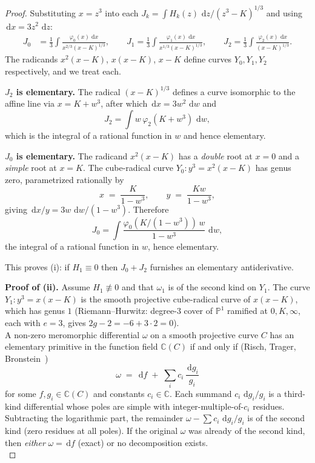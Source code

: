 \documentclass[11pt,a4paper]{article}
\theoremstyle{plain}
\theoremstyle{definition}
\theoremstyle{remark}
\newcommand{\C}{\mathbb{C}}
\renewcommand{\d}{\,\mathrm{d}}
\begin{document}
\begin{proof}
Substituting $x=z^3$ into each $J_k = \int H_k(z)\,\d z/(z^3-K)^{1/3}$ and using $\d x = 3z^2\,\d z$:
\begin{align*}
  J_0 &= \frac{1}{3}\int \frac{\varphi_0(x)\,\d x}{x^{2/3}(x-K)^{1/3}}, \qquad
  J_1 = \frac{1}{3}\int \frac{\varphi_1(x)\,\d x}{x^{1/3}(x-K)^{1/3}}, \qquad
  J_2 = \frac{1}{3}\int \frac{\varphi_2(x)\,\d x}{(x-K)^{1/3}}.
\end{align*}
The radicands $x^2(x-K)$, $x(x-K)$, $x-K$ define curves $Y_0, Y_1, Y_2$ respectively, and we treat each.

\smallskip\noindent
\textbf{$J_2$ is elementary.}
The radical $(x-K)^{1/3}$ defines a curve isomorphic to the affine line via $x=K+w^3$, after which $\d x = 3w^2\,\d w$ and
\[
  J_2 = \int w\,\varphi_2(K+w^3)\,\d w,
\]
which is the integral of a rational function in $w$ and hence elementary.

\smallskip\noindent
\textbf{$J_0$ is elementary.}
The radicand $x^2(x-K)$ has a \emph{double} root at $x=0$ and a \emph{simple} root at $x=K$. The cube-radical curve $Y_0\colon y^3 = x^2(x-K)$ has genus zero, parametrized rationally by
\begin{equation}\label{eq:Y0-param}
  x \;=\; \frac{K}{1-w^3}, \qquad y \;=\; \frac{Kw}{1-w^3},
\end{equation}
giving $\d x/y = 3w\,\d w/(1-w^3)$. Therefore
\[
  J_0 = \int \frac{\varphi_0(K/(1-w^3))\,w}{1-w^3}\,\d w,
\]
the integral of a rational function in $w$, hence elementary.

\smallskip\noindent
This proves (i): if $H_1 \equiv 0$ then $J_0 + J_2$ furnishes an elementary antiderivative.

\smallskip\noindent
\textbf{Proof of (ii).}
Assume $H_1\not\equiv 0$ and that $\omega_1$ is of the second kind on $Y_1$. The curve $Y_1\colon y^3=x(x-K)$ is the smooth projective cube-radical curve of $x(x-K)$, which has genus $1$ (Riemann--Hurwitz: degree-$3$ cover of $\mathbb{P}^1$ ramified at $0,K,\infty$, each with $e=3$, gives $2g-2 = -6 + 3\cdot 2 = 0$).\\

A non-zero meromorphic differential $\omega$ on a smooth projective curve $C$ has an elementary primitive in the function field $\C(C)$ if and only if (Risch, Trager, Bronstein~\cite{Trager1984,Bronstein2005})
\[
  \omega \;=\; \d f \;+\; \sum_{i} c_i\,\frac{\d g_i}{g_i}
\]
for some $f, g_i\in\C(C)$ and constants $c_i\in\C$. Each summand $c_i\,\d g_i/g_i$ is a third-kind differential whose poles are simple with integer-multiple-of-$c_i$ residues. Subtracting the logarithmic part, the remainder $\omega - \sum c_i\,\d g_i/g_i$ is of the second kind (zero residues at all poles). If the original $\omega$ was already of the second kind, then \emph{either} $\omega = \d f$ (exact) or no decomposition exists.\\


\end{proof}
\end{document}

